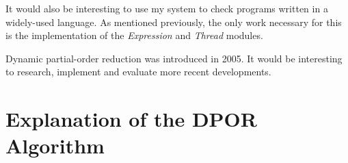 \documentclass[12pt,a4paper,twoside,openright]{report}
\begin{document}
It would also be interesting
to use my system to check
programs written in a widely-used
language. As mentioned previously,
the only work necessary for this
is the implementation of the
\textit{Expression} and
\textit{Thread} modules.

Dynamic partial-order reduction
was introduced in 2005. It would
be interesting to research,
implement and evaluate more
recent developments.



\appendix

\chapter{Explanation of the DPOR Algorithm}
\label{app:dpor-walkthrough}
\dporpseudocode
\end{document}
